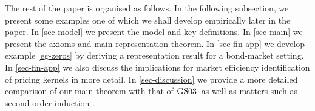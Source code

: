 \documentclass[ecta,nameyear,draft]{econsocart}
\makeatletter
\newcommand\ie{i\@.e\@ifnextchar.{}{.\@}}
\newcommand{\gsii}{$\textup{GS03}$}
\theoremstyle{plain}
\theoremstyle{remark}
\makeatother
\begin{document}
  

% 
%
 

The rest of the paper is organised as follows. In the following subsection, we
present some examples one of which we shall develop empirically later in the
paper. In \cref{sec-model} we present the model and key definitions. In
\cref{sec-main} we present the axioms and main representation theorem. In
\cref{sec-fin-app} we develop example \cref{eg-zeros} by deriving a
representation result for a bond-market setting. In \cref{sec-fin-app} we also
discuss the implications for market efficiency identification of pricing
kernels in more detail. In \cref{sec-discussion} we provide a more detailed
comparison of our main theorem with that of \gsii\ as well as matters such as
second-order induction \citep{argenziano2019second}.
\end{document}
